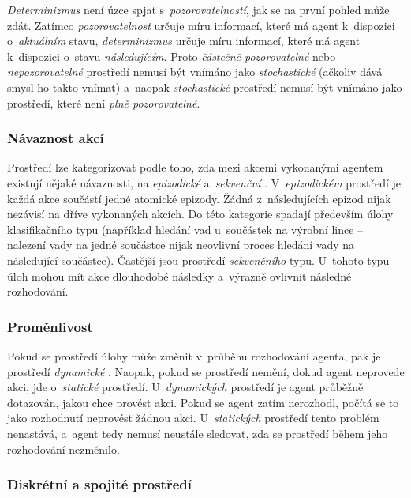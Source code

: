 \emph{Determinizmus} není úzce spjat s~\emph{pozorovatelností}, jak se na první pohled může zdát. Zatímco \emph{pozorovatelnost} určuje míru informací, které má agent k~dispozici o~\emph{aktuálním} stavu, \emph{determinizmus} určuje míru informací, které má agent k~dispozici o~stavu \emph{následujícím}. Proto \emph{částečně pozorovatelné} nebo \emph{nepozorovatelné} prostředí nemusí být vnímáno jako \emph{stochastické} (ačkoliv dává smysl ho takto vnímat) a~naopak \emph{stochastické} prostředí nemusí být vnímáno jako prostředí, které není \emph{plně pozorovatelné}.

\subsubsection*{Návaznost akcí}

Prostředí lze kategorizovat podle toho, zda mezi akcemi vykonanými agentem existují nějaké návaznosti, na \emph{epizodické} a~\emph{sekvenční} \cite{AI_Russel_Norvig}. V~\emph{epizodickém} prostředí je každá akce součástí jedné atomické epizody. Žádná z~následujících epizod nijak nezávisí na dříve vykonaných akcích. Do této kategorie spadají především úlohy klasifikačního typu (například hledání vad u~součástek na výrobní lince -- nalezení vady na jedné součástce nijak neovlivní proces hledání vady na následující součástce). Častější jsou prostředí \emph{sekvenčního} typu. U~tohoto typu úloh mohou mít akce dlouhodobé následky a~výrazně ovlivnit následné rozhodování.

\subsubsection*{Proměnlivost}

Pokud se prostředí úlohy může změnit v~průběhu rozhodování agenta, pak je prostředí \emph{dynamické} \cite{AI_Russel_Norvig}. Naopak, pokud se prostředí nemění, dokud agent neprovede akci, jde o~\emph{statické} prostředí. U~\emph{dynamických} prostředí je agent průběžně dotazován, jakou chce provést akci. Pokud se agent zatím nerozhodl, počítá se to jako rozhodnutí neprovést žádnou akci. U~\emph{statických} prostředí tento problém nenastává, a~agent tedy nemusí neustále sledovat, zda se prostředí během jeho rozhodování nezměnilo.

\subsubsection*{Diskrétní a spojité prostředí}

